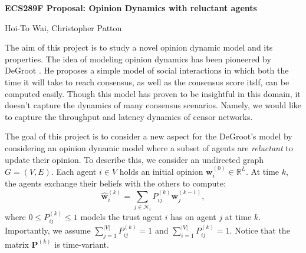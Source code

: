 \documentclass[letter]{article}
\theoremstyle{t}
\begin{document}
\setcounter{page}{1}
\linespread{1.1}
\normalsize

\setlength{\parskip}{.2cm}

\begin{center} {\Large \textbf{
ECS289F Proposal: Opinion Dynamics with  reluctant agents}} \vspace{.3cm}

{\large Hoi-To Wai, Christopher Patton}

\end{center}
\vspace{0.1cm}





The aim of this project is to study a novel opinion dynamic model and its properties. The idea of modeling opinion dynamics has been pioneered by DeGroot \cite{Degroot_74}. He proposes a simple model of social interactions in which both the time it will take to reach consensus, as well as the consensus score itslf, can be computed easily. Though this model has proven to be insightful in this domain, it doesn't capture the dynamics of many consensus scenarios. Namely, we would like to capture the throughput and latency dynamics of censor networks. 

The goal of this project is to consider a new aspect for the DeGroot's model by considering an opinion dynamic model where a subset of agents are \emph{reluctant} to update their opinion. 
To describe this, we consider an undirected graph $G = (V,E)$. Each agent $i \in V$ holds an initial opinion ${\bm w}_i^{(0)} \in \mathbb{R}^L$. At time $k$, the agents exchange their beliefs with the others to compute:
\begin{equation}\label{eq:op}
\hat{\bm w}_i^{(k)} = \sum_{j \in \mathcal{N}_i} P_{ij}^{(k)} {\bm w}_j^{(k-1)},
\end{equation}
where $0 \leq P_{ij}^{(k)} \leq 1$ models the trust agent $i$ has on agent $j$ at time $k$. Importantly, we assume $\sum_{j=1}^{|V|} P_{ij}^{(k)} = 1$ and $\sum_{i=1}^{|V|} P_{ij}^{(k)} = 1$. Notice that the matrix ${\bm P}^{(k)}$ is time-variant. 
\end{document}
